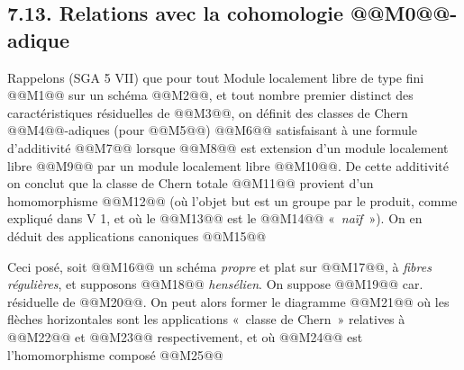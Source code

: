 
\subsection*{7.13. Relations avec la cohomologie @@M0@@-adique}
Rappelons (SGA 5 VII) que pour tout Module localement libre de type fini @@M1@@ sur un schéma @@M2@@, et tout nombre premier distinct des caractéristiques résiduelles de @@M3@@, on définit des classes de Chern @@M4@@-adiques (pour @@M5@@)
@@M6@@
satisfaisant à une formule d'additivité
@@M7@@
lorsque @@M8@@ est extension d'un module localement libre @@M9@@ par un module localement libre @@M10@@. De cette additivité on conclut que la classe de Chern totale @@M11@@ provient d'un homomorphisme
@@M12@@
(où l'objet but est un groupe par le produit, comme expliqué dans V 1, et où le @@M13@@ est le @@M14@@ «~\emph{naïf}~»). On en déduit des applications canoniques
@@M15@@

Ceci posé, soit @@M16@@ un schéma \emph{propre} et plat sur @@M17@@, à \emph{fibres régulières}, et supposons @@M18@@ \emph{hensélien}. On suppose @@M19@@ car. résiduelle de @@M20@@. On peut alors former le diagramme
@@M21@@
où les flèches horizontales sont les applications «~classe de Chern~» relatives à @@M22@@ et @@M23@@ respectivement, et où @@M24@@ est l'homomorphisme composé
@@M25@@
